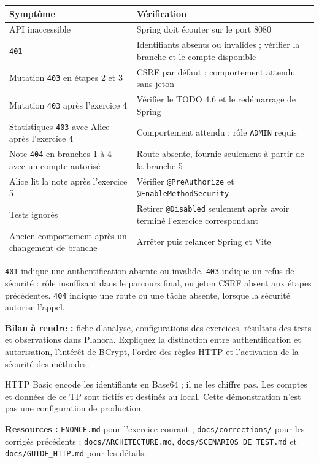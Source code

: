 \documentclass[
  french,
  10pt,
  a4paper,
]{article}
\newcounter{none} %
\begin{document}
{\def\LTcaptype{none} %
\begin{longtable}[]{@{}
  >{\raggedright\arraybackslash}p{}
  >{\raggedright\arraybackslash}p{}@{}}
\toprule\noalign{}
\begin{minipage}[b]{\linewidth}\raggedright
Symptôme
\end{minipage} & \begin{minipage}[b]{\linewidth}\raggedright
Vérification
\end{minipage} \\
\midrule\noalign{}
\endhead
\bottomrule\noalign{}
\endlastfoot
API inaccessible & Spring doit écouter sur le port 8080 \\
\texttt{401} & Identifiants absents ou invalides ; vérifier la branche
et le compte disponible \\
Mutation \texttt{403} en étapes 2 et 3 & CSRF par défaut ; comportement
attendu sans jeton \\
Mutation \texttt{403} après l'exercice 4 & Vérifier le TODO 4.6 et le
redémarrage de Spring \\
Statistiques \texttt{403} avec Alice après l'exercice 4 & Comportement
attendu : rôle \texttt{ADMIN} requis \\
Note \texttt{404} en branches 1 à 4 avec un compte autorisé & Route
absente, fournie seulement à partir de la branche 5 \\
Alice lit la note après l'exercice 5 & Vérifier \texttt{@PreAuthorize}
et \texttt{@EnableMethodSecurity} \\
Tests ignorés & Retirer \texttt{@Disabled} seulement après avoir terminé
l'exercice correspondant \\
Ancien comportement après un changement de branche & Arrêter puis
relancer Spring et Vite \\
\end{longtable}
}

\texttt{401} indique une authentification absente ou invalide.
\texttt{403} indique un refus de sécurité : rôle insuffisant dans le
parcours final, ou jeton CSRF absent aux étapes précédentes.
\texttt{404} indique une route ou une tâche absente, lorsque la sécurité
autorise l'appel.

\textbf{Bilan à rendre :} fiche d'analyse, configurations des exercices,
résultats des tests et observations dans Planora. Expliquez la
distinction entre authentification et autorisation, l'intérêt de BCrypt,
l'ordre des règles HTTP et l'activation de la sécurité des méthodes.

HTTP Basic encode les identifiants en Base64 ; il ne les chiffre pas.
Les comptes et données de ce TP sont fictifs et destinés au local. Cette
démonstration n'est pas une configuration de production.

\textbf{Ressources :} \texttt{ENONCE.md} pour l'exercice courant ;
\texttt{docs/corrections/} pour les corrigés précédents ;
\texttt{docs/ARCHITECTURE.md}, \texttt{docs/SCENARIOS\_DE\_TEST.md} et
\texttt{docs/GUIDE\_HTTP.md} pour les détails.
\end{document}
